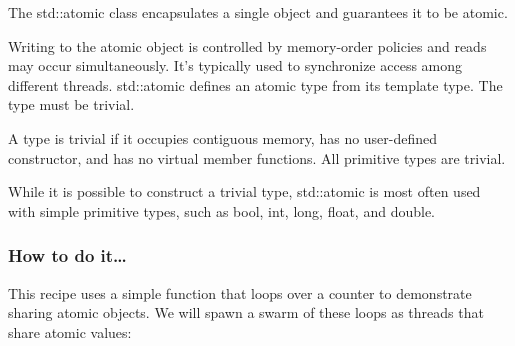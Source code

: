 
The std::atomic class encapsulates a single object and guarantees it to be atomic.

Writing to the atomic object is controlled by memory-order policies and reads may occur simultaneously. It's typically used to synchronize access among different threads.
std::atomic defines an atomic type from its template type. The type must be trivial.

A type is trivial if it occupies contiguous memory, has no user-defined constructor, and has no virtual member functions. All primitive types are trivial.

While it is possible to construct a trivial type, std::atomic is most often used with simple primitive types, such as bool, int, long, float, and double.

\subsubsection{How to do it…}

This recipe uses a simple function that loops over a counter to demonstrate sharing atomic objects. We will spawn a swarm of these loops as threads that share atomic values:

